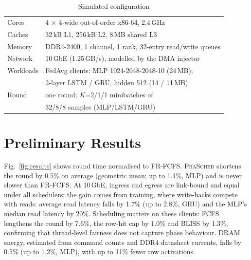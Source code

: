 \documentclass[conference]{IEEEtran}
\newcommand{\name}{\textsc{PhaSched}}
\begin{document}
\begin{table}[t]
\centering
\caption{Simulated configuration}
\label{tab:config}
\footnotesize
\begin{tabular}{@{}ll@{}}
\toprule
Cores & 4 $\times$ 4-wide out-of-order x86-64, 2.4\,GHz \\
Caches & 32\,kB L1, 256\,kB L2, 8\,MB shared L3 \\
Memory & DDR4-2400, 1 channel, 1 rank, 32-entry read/write queues \\
Network & 10\,GbE (1.25\,GB/s), modelled by the DMA injector \\
Workloads & FedAvg clients: MLP 1024-2048-2048-10 (24\,MB); \\
 & 2-layer LSTM / GRU, hidden 512 (14 / 11\,MB) \\
Round & one round; $K$=2/1/1 minibatches of \\
 & 32/8/8 samples (MLP/LSTM/GRU) \\
\bottomrule
\end{tabular}
\end{table}

\section{Preliminary Results}
Fig.~\ref{fig:results} shows round time normalised to FR-FCFS. \name{} shortens the round by 0.5\% on average (geometric mean; up to 1.1\%, MLP) and is never slower than FR-FCFS. At 10\,GbE, ingress and egress are link-bound and equal under all schedulers; the gain comes from training, where write-backs compete with reads: average read latency falls by 1.7\% (up to 2.8\%, GRU) and the MLP's median read latency by 20\%. Scheduling matters on these clients: FCFS lengthens the round by 7.6\%, the row-hit cap by 1.0\% and BLISS by 1.3\%, confirming that thread-level fairness does not capture phase behaviour. DRAM energy, estimated from command counts and DDR4 datasheet currents, falls by 0.5\% (up to 1.2\%, MLP), with up to 11\% fewer row activations.
\end{document}
